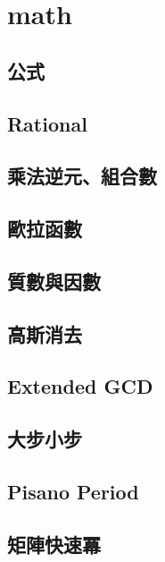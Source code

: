 \section{math}
    \subsection{公式}
        
    \subsection{Rational}
        
    \subsection{乘法逆元、組合數}
        
    \subsection{歐拉函數}
         \columnbreak
    \subsection{質數與因數}
        
    \subsection{高斯消去}
        
    \subsection{Extended GCD}
         \columnbreak
    \subsection{大步小步}
         \columnbreak
    \subsection{Pisano Period}
        
    \subsection{矩陣快速冪}
         
\clearpage

